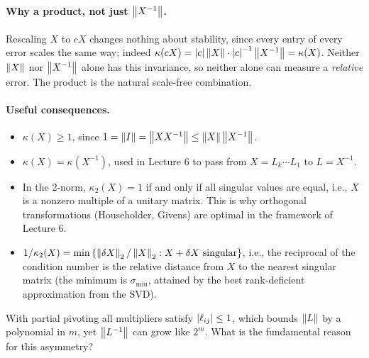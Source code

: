 \begin{answer}
  \paragraph{Why a product, not just $\left\lVert X^{-1} \right\rVert$.} Rescaling $X$ to $cX$ changes nothing about stability, since every entry of every error scales the same way; indeed $\kappa(cX) = \left\lvert c \right\rvert\left\lVert X \right\rVert \cdot \left\lvert c \right\rvert^{-1}\left\lVert X^{-1} \right\rVert = \kappa(X)$. Neither $\left\lVert X \right\rVert$ nor $\left\lVert X^{-1} \right\rVert$ alone has this invariance, so neither alone can measure a \emph{relative} error. The product is the natural scale-free combination.

  \paragraph{Useful consequences.}
  \begin{itemize}
    \item $\kappa(X) \ge 1$, since $1 = \left\lVert I \right\rVert = \left\lVert XX^{-1} \right\rVert \le \left\lVert X \right\rVert\left\lVert X^{-1} \right\rVert$.
    \item $\kappa(X) = \kappa(X^{-1})$, used in Lecture 6 to pass from $X = L_k \cdots L_1$ to $L = X^{-1}$.
    \item In the 2-norm, $\kappa_2(X) = 1$ if and only if all singular values are equal, i.e., $X$ is a nonzero multiple of a unitary matrix. This is why orthogonal transformations (Householder, Givens) are optimal in the framework of Lecture 6.
    \item $1/\kappa_2(X) = \min\left\{ \left\lVert \delta X \right\rVert_2/\left\lVert X \right\rVert_2 : X + \delta X \text{ singular} \right\}$, i.e., the reciprocal of the condition number is the relative distance from $X$ to the nearest singular matrix (the minimum is $\sigma_{\min}$, attained by the best rank-deficient approximation from the SVD).
  \end{itemize}
\end{answer}

\begin{question}
  \label{q:linv}
  With partial pivoting all multipliers satisfy $\left\lvert \ell_{ij} \right\rvert \le 1$, which bounds $\left\lVert L \right\rVert$ by a polynomial in $m$, yet $\left\lVert L^{-1} \right\rVert$ can grow like $2^m$. What is the fundamental reason for this asymmetry?
\end{question}

